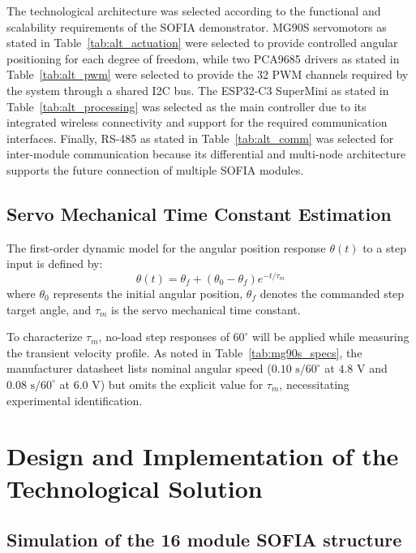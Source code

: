 \documentclass[lettersize,journal]{IEEEtran}
\begin{document}
	The technological
	architecture was selected according to the functional and scalability
	requirements of the SOFIA demonstrator. 
	MG90S servomotors as stated in Table~\ref{tab:alt_actuation} were selected to provide controlled angular positioning for each degree of freedom,
	while two PCA9685 drivers as stated in Table~\ref{tab:alt_pwm} were selected to  provide the 32 PWM channels required by the system through a shared I2C bus. The ESP32-C3 SuperMini as stated in Table~\ref{tab:alt_processing} was selected as the main controller due to its integrated wireless connectivity and support for the required communication interfaces. Finally, RS-485 as stated in Table~\ref{tab:alt_comm} was selected for inter-module communication because its differential and multi-node architecture supports the future connection of multiple
	SOFIA modules.
	
	\subsection{Servo Mechanical Time Constant Estimation}
	The first-order dynamic model for the angular position response $\theta(t)$ to a step input is defined by:
	\begin{equation}
		\theta(t) = \theta_f + (\theta_0 - \theta_f) e^{-t / \tau_m}
		\label{eq:servo_first_order}
	\end{equation}
	where $\theta_0$ represents the initial angular position, $\theta_f$ denotes the commanded step target angle, and $\tau_m$ is the servo mechanical time constant. 
	
	To characterize $\tau_m$, no-load step responses of $60^\circ$ will be applied while measuring the transient velocity profile. As noted in Table~\ref{tab:mg90s_specs}, the manufacturer datasheet \cite{mg90s} lists nominal angular speed ($0.10\text{ s}/60^\circ$ at $4.8\text{ V}$ and $0.08\text{ s}/60^\circ$ at $6.0\text{ V}$) but omits the explicit value for $\tau_m$, necessitating experimental identification.
	
	\section{Design and Implementation of the Technological Solution}
	\label{sec:design}
	\subsection{Simulation of the 16 module SOFIA structure}
	
\end{document}
